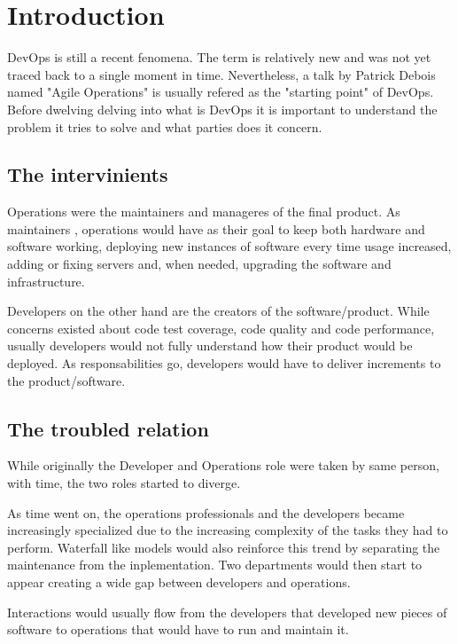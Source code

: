 \documentclass[runningheads,a4paper]{llncs}
\begin{document}
\pagebreak
\section{Introduction}

DevOps is still a recent fenomena. The term is relatively new and was not yet traced back to a single moment in time. Nevertheless, a talk by Patrick Debois named "Agile Operations" is usually refered as the "starting point" of DevOps.
Before dwelving delving into what is DevOps it is important to understand the problem it tries to solve and what parties does it concern.

\subsection{The intervinients}

Operations were the maintainers and manageres of the final product. As maintainers , operations would have as their goal to keep both hardware and software working, deploying new instances of software every time usage increased, adding or fixing servers and, when needed, upgrading the software and infrastructure.

Developers on the other hand are the creators of the software/product. While concerns existed about code test coverage, code quality and code performance, usually developers would not fully understand how their product would be deployed.
As responsabilities go, developers would have to deliver increments to the product/software.

\subsection{The troubled relation}

While originally the Developer and Operations role were taken by same person, with time, the two roles started to diverge. 

As time went on, the operations professionals and the developers became increasingly specialized due to the increasing complexity of the tasks they had to perform. Waterfall like models would also reinforce this trend by separating the maintenance from the inplementation. Two departments would then start to appear creating a wide gap between developers and operations. 

Interactions would usually flow from the developers that developed new pieces of software to operations that would have to run and maintain it.
\end{document}
